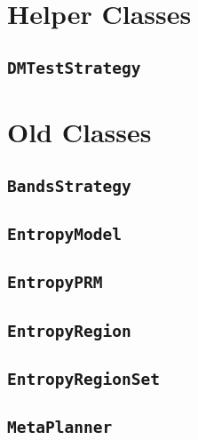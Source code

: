 \section{Helper Classes}

\subsection{\texttt{DMTestStrategy}}

\section{Old Classes}

\subsection{\texttt{BandsStrategy}}

\subsection{\texttt{EntropyModel}}

\subsection{\texttt{EntropyPRM}}

\subsection{\texttt{EntropyRegion}}

\subsection{\texttt{EntropyRegionSet}}

\subsection{\texttt{MetaPlanner}}

